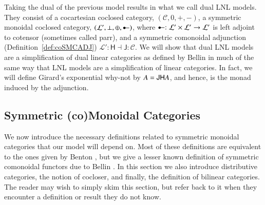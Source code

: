 \documentclass{lmcs}
\let\mto\to
\let\to\relax
\newcommand{\to}{\rightarrow}
\let\wn\relax
\newcommand{\cat}[1]{\mathcal{#1}}
\newcommand{\func}[1]{\mathsf{#1}}
\newcommand{\colimp}[0]{\multimapdotinv}
\newcommand{\wn}[0]{\mathop{?}}
\begin{document}
Taking the dual of the previous model results in what we call dual LNL
models. They consist of a cocartesian coclosed category, $(\cat{C}, 0,
+, -)$, a symmetric monoidal coclosed category, $(\cat{L}', \perp,
\oplus, \colimp)$, where $\colimp : \cat{L}' \times \cat{L}' \mto
\cat{L}'$ is left adjoint to cotensor (sometimes called parr), and a
symmetric comonoidal adjunction (Definition~\ref{def:coSMCADJ})
$\cat{L'} : \func{H} \dashv \func{J} : \cat{C}$.  We will show that dual LNL
models are a simplification of dual linear categories as defined by
Bellin \cite{Bellin:2012} in much of the same way that LNL models are
a simplification of linear categories.  In fact, we will define
Girard's exponential why-not by $\wn A = \func{JH}A$, and hence, is the
monad induced by the adjunction.

\subsection{Symmetric (co)Monoidal Categories}
\label{subsec:symmetric_monoidal_categories}
We now introduce the necessary definitions related to symmetric
monoidal categories that our model will depend on.  Most of these
definitions are equivalent to the ones given by Benton
\cite{Benton:1994}, but we give a lesser known definition of symmetric
comonoidal functors due to Bellin \cite{Bellin:2012}.  In this
section we also introduce distributive categories, the notion of
cocloser, and finally, the definition of bilinear categories.  The
reader may wish to simply skim this section, but refer back to it when
they encounter a definition or result they do not know.
\end{document}
